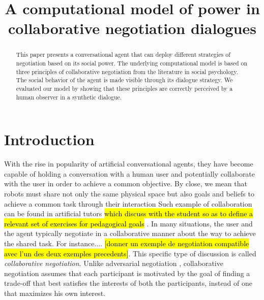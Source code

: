 \documentclass{llncs}
\begin{document}
		\title{\vskip -10pt A computational model of power in collaborative negotiation dialogues}
		
		\author{}
		\institute{}
		
		\maketitle
		
		\begin{abstract}
			This paper presents a conversational agent that can deploy different strategies of negotiation based on its social power. The underlying computational model is based on three principles of collaborative negotiation from the literature in social psychology. The social behavior of the agent is made visible through its dialogue strategy. We evaluated our model by showing that these principles are correctly perceived by a human observer in a synthetic dialogue. 
		\end{abstract}
		
		\section{Introduction}
		With the rise in popularity of artificial conversational agents, they have become capable of holding a conversation with a human user and potentially collaborate with the user in order to achieve a common objective. 
		 By  close,  we  mean  that
		 robots must share not only the same physical space but also goals and beliefs
		 to achieve a common task through their interaction
		Such example of collaboration can be found in artificial tutors \hl{which discuss with the student so as to define a relevant set of exercises for pedagogical goals} \cite{gulz2011extending}.  In many situations, the user and the agent typically negotiate in a collaborative manner about the way to achieve the shared task. For instance.... \hl{[donner un exemple de negotiation compatible avec l'un des deux exemples precedents]}. This specific type of discussion is called \emph{collaborative negotiation}. Unlike adversarial negotiation \cite{traum2008multi}, collaborative negotiation assumes that each participant is motivated by the goal of finding a trade-off that best satisfies the interests of both the participants, instead of one that maximizes his own interest\cite{sidner1994artificial,chu1995response}.
		
\end{document}

